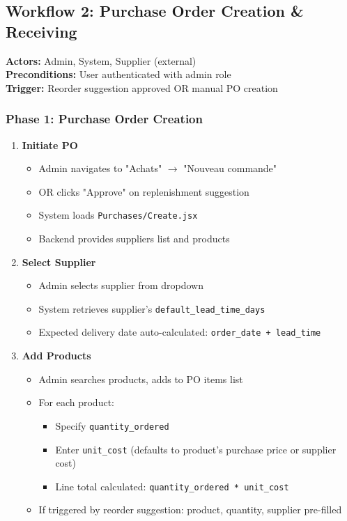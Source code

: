 \subsection{Workflow 2: Purchase Order Creation \& Receiving}

\textbf{Actors:} Admin, System, Supplier (external)\\
\textbf{Preconditions:} User authenticated with admin role\\
\textbf{Trigger:} Reorder suggestion approved OR manual PO creation

\subsubsection{Phase 1: Purchase Order Creation}

\begin{enumerate}[leftmargin=*]
    \item \textbf{Initiate PO}
    \begin{itemize}
        \item Admin navigates to "Achats" $\rightarrow$ "Nouveau commande"
        \item OR clicks "Approve" on replenishment suggestion
        \item System loads \texttt{Purchases/Create.jsx}
        \item Backend provides suppliers list and products
    \end{itemize}
    
    \item \textbf{Select Supplier}
    \begin{itemize}
        \item Admin selects supplier from dropdown
        \item System retrieves supplier's \texttt{default\_lead\_time\_days}
        \item Expected delivery date auto-calculated: \texttt{order\_date + lead\_time}
    \end{itemize}
    
    \item \textbf{Add Products}
    \begin{itemize}
        \item Admin searches products, adds to PO items list
        \item For each product:
        \begin{itemize}
            \item Specify \texttt{quantity\_ordered}
            \item Enter \texttt{unit\_cost} (defaults to product's purchase price or supplier cost)
            \item Line total calculated: \texttt{quantity\_ordered * unit\_cost}
        \end{itemize}
        \item If triggered by reorder suggestion: product, quantity, supplier pre-filled
    \end{itemize}
    

\end{enumerate}
